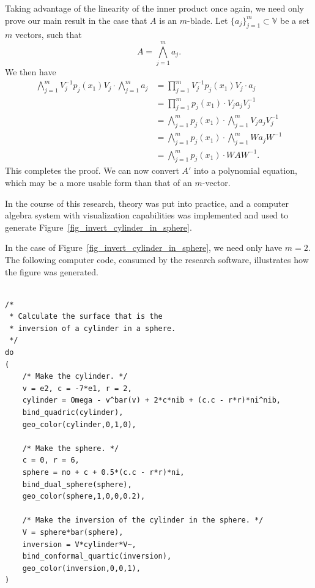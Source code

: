 \documentclass{ecgd-l}
\theoremstyle{definition}
\theoremstyle{remark}
\numberwithin{equation}{section}
\newcommand{\V}{\mathbb{V}}
\begin{document}
Taking advantage of the linearity of the inner product once again,
we need only prove our main result in the case that $A$ is an $m$-blade.
Let $\{a_j\}_{j=1}^m\subset \V$ be a set $m$ vectors, such that
\begin{equation*}
A = \bigwedge_{j=1}^m a_j.
\end{equation*}
We then have
\begin{align}
\bigwedge_{j=1}^m V_j^{-1}p_j(x_1)V_j\cdot\bigwedge_{j=1}^m a_j &=
\prod_{j=1}^m V_j^{-1}p_j(x_1)V_j\cdot a_j\nonumber \\
 &= \prod_{j=1}^m p_j(x_1)\cdot V_ja_jV_j^{-1}\nonumber \\
&= \bigwedge_{j=1}^m p_j(x_1)\cdot\bigwedge_{j=1}^m V_ja_jV_j^{-1}\nonumber \\
&= \bigwedge_{j=1}^m p_j(x_1)\cdot\bigwedge_{j=1}^m Wa_jW^{-1}\nonumber \\
&= \bigwedge_{j=1}^m p_j(x_1)\cdot WAW^{-1}.\nonumber
\end{align}
This completes the proof.
We can now convert $A'$ into a polynomial equation, which
may be a more usable form than that of an $m$-vector.

In the course of this research, theory was put into practice, and a computer algebra
system with visualization capabilities was implemented and used to generate
Figure~\ref{fig_invert_cylinder_in_sphere}.

In the case of Figure~\ref{fig_invert_cylinder_in_sphere}, we need only
have $m=2$.  The following computer code, consumed by the research
software, illustrates how the figure was generated.
\begin{center}
{\tiny
\begin{verbatim}

/*
 * Calculate the surface that is the
 * inversion of a cylinder in a sphere.
 */
do
(
    /* Make the cylinder. */
    v = e2, c = -7*e1, r = 2,
    cylinder = Omega - v^bar(v) + 2*c*nib + (c.c - r*r)*ni^nib,
    bind_quadric(cylinder),
    geo_color(cylinder,0,1,0),
	
    /* Make the sphere. */
    c = 0, r = 6,
    sphere = no + c + 0.5*(c.c - r*r)*ni,
    bind_dual_sphere(sphere),
    geo_color(sphere,1,0,0,0.2),
	
    /* Make the inversion of the cylinder in the sphere. */
    V = sphere*bar(sphere),
    inversion = V*cylinder*V~,
    bind_conformal_quartic(inversion),
    geo_color(inversion,0,0,1),
)

\end{verbatim}
}
\end{center}
\end{document}
